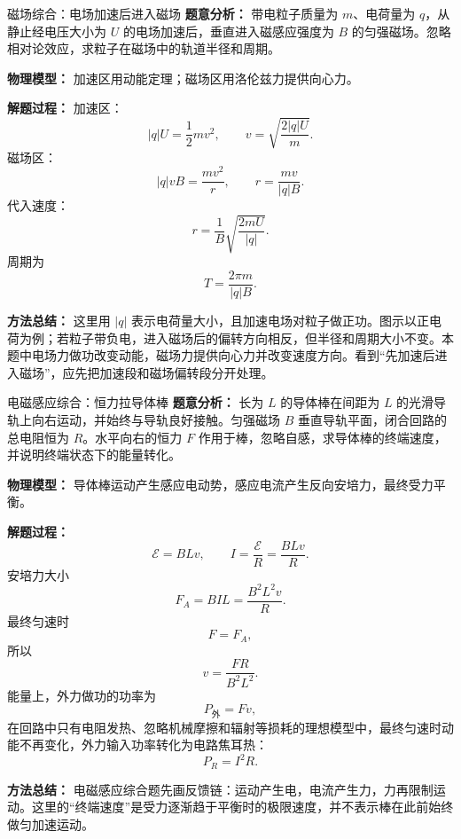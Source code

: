 \begin{examplebox}{磁场综合：电场加速后进入磁场}
\textbf{题意分析：} 带电粒子质量为 $m$、电荷量为 $q$，从静止经电压大小为 $U$ 的电场加速后，垂直进入磁感应强度为 $B$ 的匀强磁场。忽略相对论效应，求粒子在磁场中的轨道半径和周期。

\textbf{物理模型：} 加速区用动能定理；磁场区用洛伦兹力提供向心力。

\begin{center}

\end{center}

\textbf{解题过程：}
加速区：
\[
|q|U=\frac12mv^2,\qquad v=\sqrt{\frac{2|q|U}{m}}.
\]
磁场区：
\[
|q|vB=\frac{mv^2}{r},\qquad r=\frac{mv}{|q|B}.
\]
代入速度：
\[
r=\frac{1}{B}\sqrt{\frac{2mU}{|q|}}.
\]
周期为
\[
T=\frac{2\pi m}{|q|B}.
\]

\textbf{方法总结：} 这里用 $|q|$ 表示电荷量大小，且加速电场对粒子做正功。图示以正电荷为例；若粒子带负电，进入磁场后的偏转方向相反，但半径和周期大小不变。本题中电场力做功改变动能，磁场力提供向心力并改变速度方向。看到“先加速后进入磁场”，应先把加速段和磁场偏转段分开处理。
\end{examplebox}

\begin{examplebox}{电磁感应综合：恒力拉导体棒}
\textbf{题意分析：} 长为 $L$ 的导体棒在间距为 $L$ 的光滑导轨上向右运动，并始终与导轨良好接触。匀强磁场 $B$ 垂直导轨平面，闭合回路的总电阻恒为 $R$。水平向右的恒力 $F$ 作用于棒，忽略自感，求导体棒的终端速度，并说明终端状态下的能量转化。

\textbf{物理模型：} 导体棒运动产生感应电动势，感应电流产生反向安培力，最终受力平衡。

\begin{center}

\end{center}

\textbf{解题过程：}
\[
\mathcal E=BLv,\qquad I=\frac{\mathcal E}{R}=\frac{BLv}{R}.
\]
安培力大小
\[
F_A=BIL=\frac{B^2L^2v}{R}.
\]
最终匀速时
\[
F=F_A,
\]
所以
\[
v=\frac{FR}{B^2L^2}.
\]
能量上，外力做功的功率为
\[
P_{\text{外}}=Fv,
\]
在回路中只有电阻发热、忽略机械摩擦和辐射等损耗的理想模型中，最终匀速时动能不再变化，外力输入功率转化为电路焦耳热：
\[
P_R=I^2R.
\]

\textbf{方法总结：} 电磁感应综合题先画反馈链：运动产生电，电流产生力，力再限制运动。这里的“终端速度”是受力逐渐趋于平衡时的极限速度，并不表示棒在此前始终做匀加速运动。
\end{examplebox}

